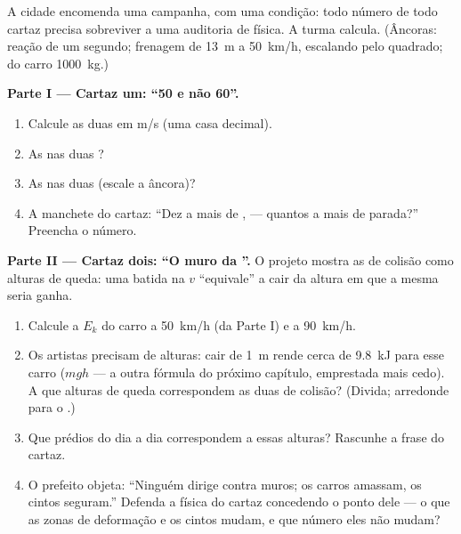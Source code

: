 \begin{problem}\label{pb:g9:kinetic-energy-safety:1}
A cidade encomenda uma campanha, com uma condição: todo número de
todo cartaz precisa sobreviver a uma auditoria de física. A turma
calcula. (Âncoras: reação de um segundo; frenagem de \qty{13}{m} a
\qty{50}{km/h}, escalando pelo quadrado;  do carro
\qty{1000}{kg}.)

\medskip\noindent\textbf{Parte I --- Cartaz um: ``50 e não 60''.}
\begin{enumerate}
  \item Calcule as duas  em \unit{m/s} (uma casa decimal).
  \item As  nas duas ?
  \item As  nas duas (escale a âncora)?
  \item A manchete do cartaz: ``Dez  a mais de ,
        --- quantos  a mais de parada?'' Preencha o número.
\end{enumerate}

\medskip\noindent\textbf{Parte II --- Cartaz dois: ``O muro da
''.}
O projeto mostra as  de colisão como alturas de queda: uma
batida na  $v$ ``equivale'' a cair da altura em que a mesma
 seria ganha.
\begin{enumerate}[resume]
  \item Calcule a $E_k$ do carro a \qty{50}{km/h} (da Parte I) e a
        \qty{90}{km/h}.
  \item Os artistas precisam de alturas: cair de \qty{1}{m} rende
        cerca de \qty{9.8}{kJ} para esse carro ($m g h$ --- a outra
        fórmula do próximo capítulo, emprestada mais cedo). A que
        alturas de queda correspondem as duas  de colisão?
        (Divida; arredonde para o .)
  \item Que prédios do dia a dia correspondem a essas alturas?
        Rascunhe a frase do cartaz.
  \item O prefeito objeta: ``Ninguém dirige contra muros; os carros
        amassam, os cintos seguram.'' Defenda a física do cartaz
        concedendo o ponto dele --- o que as zonas de deformação e os
        cintos mudam, e que número eles não mudam?
\end{enumerate}


\end{problem}
